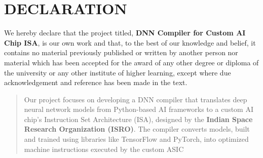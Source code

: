 \documentclass[12pt]{report}
\begin{document}
\begin{spacing}{1.01}
{{\begin{tabular}{p{4.8cm}cp{4.5cm}}
\end{tabular}
}
}
\chapter*{DECLARATION}
We hereby declare that the project titled, \textbf{DNN Compiler for Custom AI Chip ISA}, is our own work and that, to the best of our knowledge and belief, it contains no material previously published or written by another person nor material which has been accepted for the award of any other degree or diploma of the university or any other institute of higher learning, except where due acknowledgement and reference has been made in the text.\\

\vspace{1.2cm}


\vspace{2cm}


\vspace{1.2cm}


\vspace{1.2cm}


\newpage


\begin{abstract}
Our project focuses on developing a DNN compiler that translates deep neural network models from Python-based AI frameworks to a custom AI chip’s Instruction Set Architecture (ISA), designed by the \textbf{Indian Space Research Organization (ISRO)}. The compiler converts models, built and trained using libraries like TensorFlow and PyTorch, into optimized machine instructions executed by the custom ASIC


\end{abstract}
\end{spacing}
\end{document}
